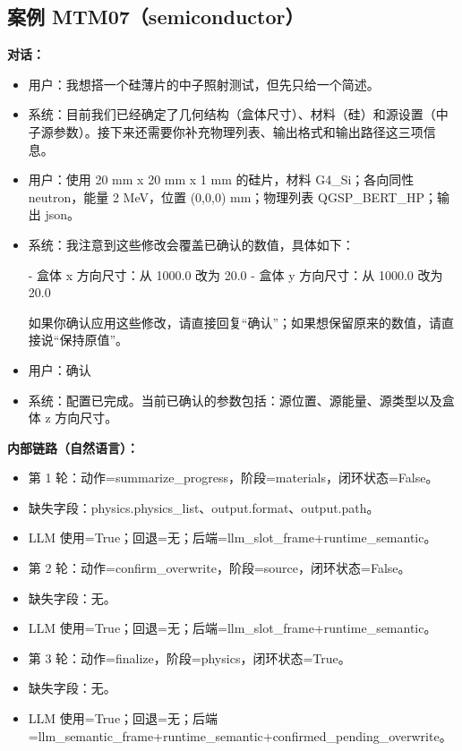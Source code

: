 \documentclass[11pt]{ctexart}
\begin{document}
\subsection{案例 MTM07（semiconductor）}
\textbf{对话：}
\begin{itemize}
\item 用户：我想搭一个硅薄片的中子照射测试，但先只给一个简述。
\item 系统：目前我们已经确定了几何结构（盒体尺寸）、材料（硅）和源设置（中子源参数）。接下来还需要你补充物理列表、输出格式和输出路径这三项信息。
\item 用户：使用 20 mm x 20 mm x 1 mm 的硅片，材料 G4\_Si；各向同性 neutron，能量 2 MeV，位置 (0,0,0) mm；物理列表 QGSP\_BERT\_HP；输出 json。
\item 系统：我注意到这些修改会覆盖已确认的数值，具体如下：

- 盒体 x 方向尺寸：从 1000.0 改为 20.0
- 盒体 y 方向尺寸：从 1000.0 改为 20.0

如果你确认应用这些修改，请直接回复“确认”；如果想保留原来的数值，请直接说“保持原值”。
\item 用户：确认
\item 系统：配置已完成。当前已确认的参数包括：源位置、源能量、源类型以及盒体 z 方向尺寸。
\end{itemize}
\textbf{内部链路（自然语言）：}
\begin{itemize}
\item 第 1 轮：动作=summarize\_progress，阶段=materials，闭环状态=False。
\item 缺失字段：physics.physics\_list、output.format、output.path。
\item LLM 使用=True；回退=无；后端=llm\_slot\_frame+runtime\_semantic。
\item 第 2 轮：动作=confirm\_overwrite，阶段=source，闭环状态=False。
\item 缺失字段：无。
\item LLM 使用=True；回退=无；后端=llm\_slot\_frame+runtime\_semantic。
\item 第 3 轮：动作=finalize，阶段=physics，闭环状态=True。
\item 缺失字段：无。
\item LLM 使用=True；回退=无；后端=llm\_semantic\_frame+runtime\_semantic+confirmed\_pending\_overwrite。
\end{itemize}
\end{document}
